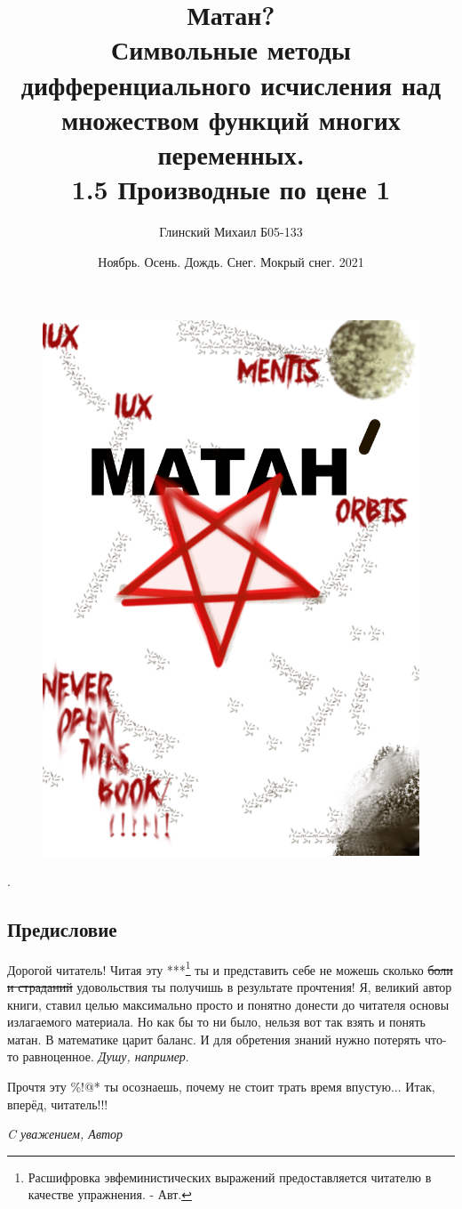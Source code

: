 \documentclass{report}
\title{\textbf{\Huge Матан?}\\ {\LARGE Символьные методы дифференциального исчисления над множеством функций многих переменных.}\\ {\small 1.5 Производные по цене 1}}
\author{Глинский Михаил Б05-133 }
\date{Ноябрь. Осень. Дождь. Снег. Мокрый снег. 2021}
\begin{document}
	\begin{figure}[h]
		\centering
		\includegraphics[width=\textwidth,height=\textheight]{hell2}
	\end{figure}.
	\restoregeometry
\maketitle
\vspace*{\fill}
\begin{center}
\section*{Предисловие}
\end{center}
\vspace*{\fill}
Дорогой читатель! Читая эту ***\footnote{Расшифровка эвфеминистических выражений предоставляется читателю в качестве упражнения. - Авт.} ты и представить себе не можешь сколько \sout{боли и страданий} удовольствия ты получишь в результате прочтения!
Я, великий автор книги, ставил целью максимально просто и понятно донести до читателя основы излагаемого материала.
Но как бы то ни было, нельзя вот так взять и понять матан. В математике царит баланс. И для обретения знаний нужно потерять что-то равноценное. \textit{Душу, например}.

Прочтя эту \%!@* ты осознаешь, почему не стоит трать время впустую... Итак, вперёд, читатель!!!

\begin{flushright}
\textit{C уважением, Автор}
\end{flushright}

\vspace*{\fill}
\tableofcontents
\end{document}
